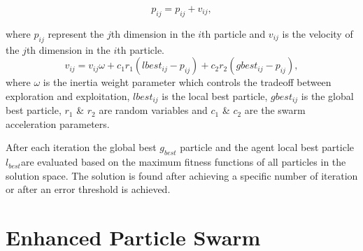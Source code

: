 \documentclass[10pt]{article}
\begin{document}
\begin{equation}
p_{ij}=p_{ij}+v_{ij},
\label{eq:Swarm1}
\end{equation}
 
where $p_{ij}$ represent the $j$th dimension in the $i$th particle and $v_{ij}$ is the velocity of the $j$th dimension in the $i$th particle.
 \begin{equation}
v_{ij}  = v_{ij} \omega + c_1 r_1 (lbest_{ij}  - p_{ij} ) + c_2 r_2 (gbest_{ij}  - p_{ij} ),
\label{eq:Swarm}
\end{equation}
 where $\omega$ is the inertia weight parameter which controls the tradeoff between exploration and exploitation,  $lbest_{ij}$ is the local best particle, $gbest_{ij}$ is the global best particle, $r_1$ \& $r_2$ are random variables and $c_1$ \& $c_2$ are the swarm acceleration parameters.  
 
 After each iteration the global best $g_{best}$ particle and the agent local best particle $l_{best}$are evaluated based on the maximum fitness functions of all particles in the solution space. The solution is found after achieving a specific number of iteration or after an error threshold is achieved.

\section{Enhanced Particle Swarm}
\end{document}
